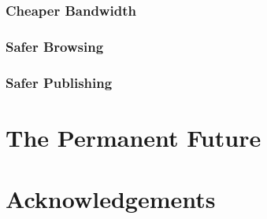 \documentclass{sig-alternate}
\begin{document}
\subsubsection{Cheaper Bandwidth}
\subsubsection{Safer Browsing}
\subsubsection{Safer Publishing}


\section{The Permanent Future}



\section{Acknowledgements}



%
%
\end{document}
